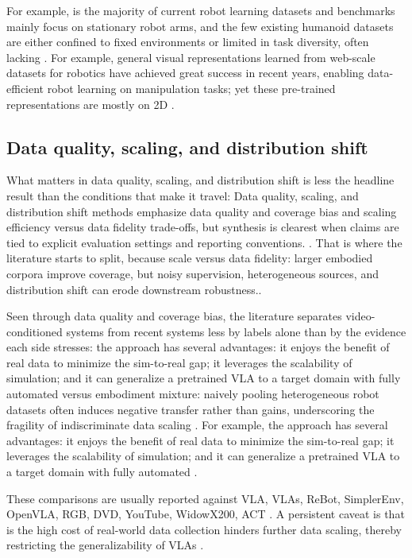 \documentclass[a4paper,11pt]{article}
\begin{document}
For example, is the majority of current robot learning datasets and benchmarks mainly focus on stationary robot arms, and the few existing humanoid datasets are either confined to fixed environments or limited in task diversity, often lacking \citep{Zhao2025Humanoid}. For example, general visual representations learned from web-scale datasets for robotics have achieved great success in recent years, enabling data-efficient robot learning on manipulation tasks; yet these pre-trained representations are mostly on 2D \citep{Hou2025Visual}.

\subsection{Data quality, scaling, and distribution shift}


What matters in data quality, scaling, and distribution shift is less the headline result than the conditions that make it travel: Data quality, scaling, and distribution shift methods emphasize data quality and coverage bias and scaling efficiency versus data fidelity trade-offs, but synthesis is clearest when claims are tied to explicit evaluation settings and reporting conventions. \citep{Hou2025Dita,Zhang2025Robowheel,Mazza2026Improving,Spiridonov2025Generalist}. That is where the literature starts to split, because scale versus data fidelity: larger embodied corpora improve coverage, but noisy supervision, heterogeneous sources, and distribution shift can erode downstream robustness..

Seen through data quality and coverage bias, the literature separates video-conditioned systems from recent systems less by labels alone than by the evidence each side stresses: the approach has several advantages: it enjoys the benefit of real data to minimize the sim-to-real gap; it leverages the scalability of simulation; and it can generalize a pretrained VLA to a target domain with fully automated versus embodiment mixture: naively pooling heterogeneous robot datasets often induces negative transfer rather than gains, underscoring the fragility of indiscriminate data scaling \citep{Fang2025Rebot,Chen2021Learning,Wang2026Rethinking,Luo2026Being}. For example, the approach has several advantages: it enjoys the benefit of real data to minimize the sim-to-real gap; it leverages the scalability of simulation; and it can generalize a pretrained VLA to a target domain with fully automated \citep{Fang2025Rebot}.

These comparisons are usually reported against VLA, VLAs, ReBot, SimplerEnv, OpenVLA, RGB, DVD, YouTube, WidowX200, ACT \citep{Fang2025Rebot,Chen2021Learning,Mazza2026Improving,Wang2026Rethinking}. A persistent caveat is that is the high cost of real-world data collection hinders further data scaling, thereby restricting the generalizability of VLAs \citep{Fang2025Rebot}.
\end{document}
